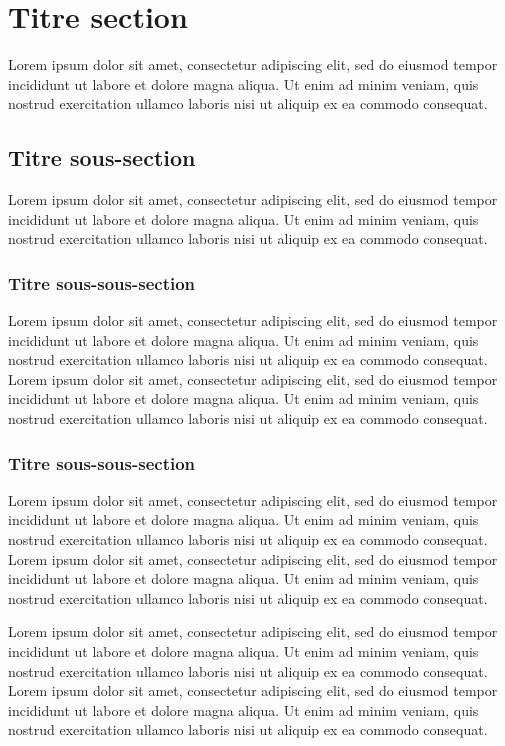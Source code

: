 \documentclass[a4paper]{book}
\begin{document}
\section{Titre section}

Lorem ipsum dolor sit amet, consectetur adipiscing elit, sed do eiusmod tempor
incididunt ut labore et dolore magna aliqua. Ut enim ad minim veniam, quis
nostrud exercitation ullamco laboris nisi ut aliquip ex ea commodo consequat.

\subsection{Titre sous-section}

Lorem ipsum dolor sit amet, consectetur adipiscing elit, sed do eiusmod tempor
incididunt ut labore et dolore magna aliqua. Ut enim ad minim veniam, quis
nostrud exercitation ullamco laboris nisi ut aliquip ex ea commodo consequat.

\subsubsection{Titre sous-sous-section}

Lorem ipsum dolor sit amet, consectetur adipiscing elit, sed do eiusmod tempor
incididunt ut labore et dolore magna aliqua. Ut enim ad minim veniam, quis
nostrud exercitation ullamco laboris nisi ut aliquip ex ea commodo consequat.
Lorem ipsum dolor sit amet, consectetur adipiscing elit, sed do eiusmod tempor
incididunt ut labore et dolore magna aliqua. Ut enim ad minim veniam, quis
nostrud exercitation ullamco laboris nisi ut aliquip ex ea commodo consequat.

\subsubsection{Titre sous-sous-section}

Lorem ipsum dolor sit amet, consectetur adipiscing elit, sed do eiusmod tempor
incididunt ut labore et dolore magna aliqua. Ut enim ad minim veniam, quis
nostrud exercitation ullamco laboris nisi ut aliquip ex ea commodo consequat.
Lorem ipsum dolor sit amet, consectetur adipiscing elit, sed do eiusmod tempor
incididunt ut labore et dolore magna aliqua. Ut enim ad minim veniam, quis
nostrud exercitation ullamco laboris nisi ut aliquip ex ea commodo consequat.

Lorem ipsum dolor sit amet, consectetur adipiscing elit, sed do eiusmod tempor
incididunt ut labore et dolore magna aliqua. Ut enim ad minim veniam, quis
nostrud exercitation ullamco laboris nisi ut aliquip ex ea commodo consequat.
Lorem ipsum dolor sit amet, consectetur adipiscing elit, sed do eiusmod tempor
incididunt ut labore et dolore magna aliqua. Ut enim ad minim veniam, quis
nostrud exercitation ullamco laboris nisi ut aliquip ex ea commodo consequat.
\end{document}
